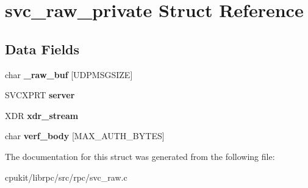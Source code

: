 \hypertarget{structsvc__raw__private}{}\section{svc\+\_\+raw\+\_\+private Struct Reference}
\label{structsvc__raw__private}
\subsection*{Data Fields}
\begin{DoxyCompactItemize}
\item 
\mbox{\label{structsvc__raw__private_a07d34e6b6896d176cdc370c61b15bbc9}} 
char {\bfseries \+\_\+raw\+\_\+buf} \mbox{[}U\+D\+P\+M\+S\+G\+S\+I\+ZE\mbox{]}
\item 
\mbox{\label{structsvc__raw__private_a842f08ae6eab91493dbba09a835f634a}} 
S\+V\+C\+X\+P\+RT {\bfseries server}
\item 
\mbox{\label{structsvc__raw__private_ac573ebac5feee41c3c028dc428a78a92}} 
X\+DR {\bfseries xdr\+\_\+stream}
\item 
\mbox{\label{structsvc__raw__private_a05ffcbe0bf9d06c7d996c9b60eaa1052}} 
char {\bfseries verf\+\_\+body} \mbox{[}M\+A\+X\+\_\+\+A\+U\+T\+H\+\_\+\+B\+Y\+T\+ES\mbox{]}
\end{DoxyCompactItemize}


The documentation for this struct was generated from the following file\+:\begin{DoxyCompactItemize}
\item 
cpukit/librpc/src/rpc/svc\+\_\+raw.\+c\end{DoxyCompactItemize}
